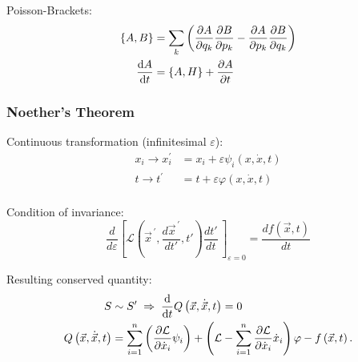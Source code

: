 			\noindent
			Poisson-Brackets:
			\begin{equation}
				\begin{aligned}
					\lbrace A, B \rbrace &= \sum_k \left(
						\frac{\partial A}{\partial q_k}\frac{\partial B}{\partial p_k} - \frac{\partial A}{\partial p_k}\frac{\partial B}{\partial q_k}
					\right) \\
					\frac{\mathrm{d} A}{\mathrm{d} t} &= \left\lbrace A, H \right\rbrace + \frac{\partial A}{\partial t}
				\end{aligned}
			\end{equation}

		\subsubsection{Noether's Theorem}
			\noindent
			Continuous transformation (infinitesimal $\varepsilon$): %
			\begin{equation}
				\begin{aligned}
				x_i \rightarrow x_{i}^{\prime} &= x_i+\varepsilon\psi_i\left(x,\dot{x},t\right) \\
					t\rightarrow t^{\prime}\, &= t+\varepsilon\varphi\left(x,\dot{x},t\right) \\
				\end{aligned}
			\end{equation}

			\noindent
			Condition of invariance:
			\begin{equation}
				\frac{d}{d\varepsilon}\left[\mathcal{L}\left( {\vec{x}}^{\,\prime},\frac{d {\vec{x}}^{\,\prime}}{dt'},t'\right) \frac{dt'}{dt}\,\right]_{\varepsilon=0}=\frac{df(\vec{x}, t)}{dt}
			\end{equation}

			\noindent
			Resulting conserved quantity:
			\begin{equation}
				\begin{aligned}
					S &\sim S' \;\Rightarrow\;
					\frac{\mathrm{d} }{\mathrm{d} t} Q\left(\vec{x},\dot{\vec{x}},t\right) = 0 \\
					Q\left(\vec{x},\dot{\vec{x}},t\right) &= \sum_{i=1}^{n}\left(\frac{\partial\mathcal{L}}{\partial{\dot{x}}_i}\psi_i\right)+\left(\mathcal{L}-\sum_{i=1}^{n}{\frac{\partial\mathcal{L}}{\partial{\dot{x}}_i}{\dot{x}}_i}\right)\varphi - f\left(\vec{x},t\right).
				\end{aligned}
			\end{equation}

